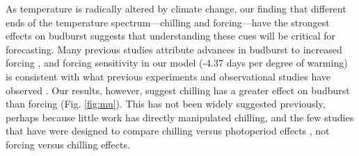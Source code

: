 \documentclass{article}
\begin{document}

\par As temperature is radically altered by climate change, our finding that different ends of the temperature spectrum---chilling and forcing---have the strongest effects on budburst suggests that understanding these cues will be critical for forecasting. Many previous studies attribute advances in budburst to increased forcing \citep{Basler:2014aa,bradley1999,menzel2006,harrington2015}, and forcing sensitivity in our model (-4.37 days per degree of warming) is consistent with what previous experiments and observational studies have observed \citep{wolkovich2012,menzel2006}. Our results, however, suggest chilling has a greater effect on budburst than forcing (Fig. \ref{fig:mu}). This has not been widely suggested previously, perhaps because little work has directly manipulated chilling, and the few studies that have were designed to compare chilling versus photoperiod effects \citep[e.g., ][]{Basler:2014aa,Caffarra:2011qf,Laube:2014a,zohner2016}, not forcing versus chilling effects. 
\end{document}

